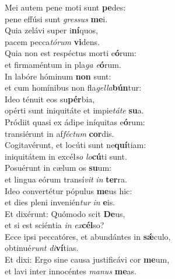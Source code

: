 \evenverse Mei autem pene moti sunt \textbf{pe}des:~\*\\
\evenverse pene effúsi sunt \textit{gres}\textit{sus} \textbf{me}i.\\
\oddverse Quia zelávi super i\textbf{ní}quos,~\*\\
\oddverse pacem pecca\textit{tó}\textit{rum} \textbf{vi}dens.\\
\evenverse Quia non est respéctus morti e\textbf{ó}rum:~\*\\
\evenverse et firmaméntum in pla\textit{ga} \textit{e}\textbf{ó}rum.\\
\oddverse In labóre hóminum \textbf{non} sunt:~\*\\
\oddverse et cum homínibus non fla\textit{gel}\textit{la}\textbf{bún}tur:\\
\evenverse Ideo ténuit eos su\textbf{pér}bia,~\*\\
\evenverse opérti sunt iniquitáte et impie\textit{tá}\textit{te} \textbf{su}a.\\
\oddverse Pródiit quasi ex ádipe iníquitas e\textbf{ó}rum:~\*\\
\oddverse transiérunt in af\textit{fé}\textit{ctum} \textbf{cor}dis.\\
\evenverse Cogitavérunt, et locúti sunt ne\textbf{quí}tiam:~\*\\
\evenverse iniquitátem in excél\textit{so} \textit{lo}\textbf{cú}ti sunt.\\
\oddverse Posuérunt in cælum os \textbf{su}um:~\*\\
\oddverse et lingua eórum transí\textit{vit} \textit{in} \textbf{ter}ra.\\
\evenverse Ideo convertétur pópulus \textbf{me}us hic:~\*\\
\evenverse et dies pleni invenién\textit{tur} \textit{in} \textbf{e}is.\\
\oddverse Et dixérunt: Quómodo scit \textbf{De}us,~\*\\
\oddverse et si est sciéntia \textit{in} \textit{ex}\textbf{cél}so?\\
\evenverse Ecce ipsi peccatóres, et abundántes in \textbf{sǽ}culo,~\*\\
\evenverse obtinué\textit{runt} \textit{di}\textbf{ví}tias.\\
\oddverse Et dixi: Ergo sine causa justificávi cor \textbf{me}um,~\*\\
\oddverse et lavi inter innocéntes \textit{ma}\textit{nus} \textbf{me}as.\\
